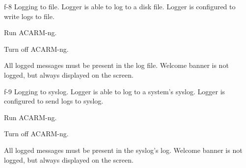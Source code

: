 \testCase
{f-8}
{Logging to file.}
{Logger is able to log to a disk file.}
{Logger is configured to write logs to file.}
{
\begin{enumerate*}
\item Run ACARM-ng.
\item Turn off ACARM-ng.
\end{enumerate*}
}
{All logged messages must be present in the log file.}
{Welcome banner is not logged, but always displayed on the screen.}


\testCase
{f-9}
{Logging to syslog.}
{Logger is able to log to a system's syslog.}
{Logger is configured to send logs to syslog.}
{
\begin{enumerate*}
\item Run ACARM-ng.
\item Turn off ACARM-ng.
\end{enumerate*}
}
{All logged messages must be present in the syslog's log.}
{Welcome banner is not logged, but always displayed on the screen.}
